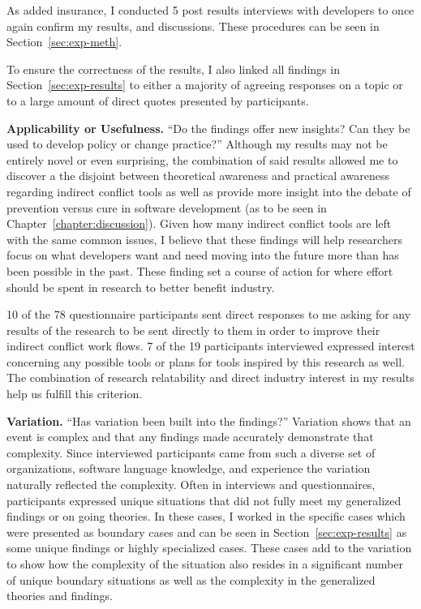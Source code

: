 As added insurance, I conducted 5 post results interviews with developers to once again confirm my results, and discussions. These
procedures can be seen in Section~\ref{sec:exp-meth}.

To ensure the correctness of the results, I also linked all findings in Section~\ref{sec:exp-results} to either a majority of agreeing
responses on a topic or to a large amount of direct quotes presented by participants.

{\bfseries Applicability or Usefulness.} ``Do the findings offer new insights? Can they be used to develop policy or change practice?''
Although my results may not be entirely novel or even surprising, the combination of said results allowed me to discover a
the disjoint between theoretical awareness and practical awareness regarding indirect conflict tools as well as provide more
insight into the debate of prevention versus cure in software development (as to be seen in Chapter~\ref{chapter:discussion}). 
Given how many indirect conflict tools are left with the same common
issues, I believe that these findings will help researchers focus on what developers want and need moving into the future more than has
been possible in the past. These finding set a course of action for where effort should be spent in research to better benefit industry.

10 of the 78 questionnaire participants sent direct responses to me asking for any results of the research to be sent directly to
them in order to improve their indirect conflict work flows. 7 of the 19 participants interviewed expressed interest concerning any possible
tools or plans for tools inspired by this research as well. The combination of research relatability and direct industry interest 
in my results help us fulfill this criterion.

{\bfseries Variation.} ``Has variation been built into the findings?'' Variation shows that an event is complex and that any findings
made accurately demonstrate that complexity. Since interviewed participants came from such a diverse set of organizations, 
software language knowledge, and experience the variation naturally reflected the complexity. Often in interviews and questionnaires, participants
expressed unique situations that did not fully meet my generalized findings or on going theories. In these cases, I worked in the specific
cases which were presented as boundary cases and can be seen in Section~\ref{sec:exp-results} as some unique findings or highly
specialized cases. These cases add to the variation
to show how the complexity of the situation also resides in a significant number of unique boundary situations as well as the complexity
in the generalized theories and findings.

